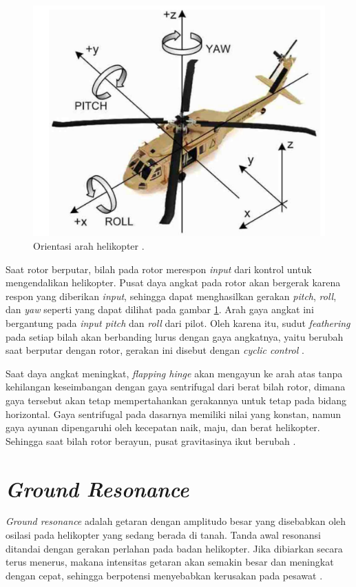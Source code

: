 \begin{figure}[H]
	\centering
	\includegraphics[width=0.55\linewidth]{gambar/roll-pitch-yaw.png}
	\caption{Orientasi arah helikopter \cite{Jhwang}.}
	\label{fig:orientasiheli}
\end{figure}

Saat rotor berputar, bilah pada rotor merespon \textit{input} dari kontrol untuk mengendalikan helikopter. Pusat daya angkat pada rotor akan bergerak karena respon yang diberikan \textit{input}, sehingga dapat menghasilkan gerakan \textit{pitch}, \textit{roll}, dan \textit{yaw} seperti yang dapat dilihat pada gambar \ref{fig:orientasiheli}. Arah gaya angkat ini bergantung pada \textit{input pitch} dan \textit{roll} dari pilot. Oleh karena itu, sudut \textit{feathering} pada setiap bilah akan berbanding lurus dengan gaya angkatnya, yaitu berubah saat berputar dengan rotor, gerakan ini disebut dengan \textit{cyclic control} \cite{handbook}.

Saat daya angkat meningkat, \textit{flapping hinge} akan mengayun ke arah atas tanpa kehilangan keseimbangan dengan gaya sentrifugal dari berat bilah rotor, dimana gaya tersebut akan tetap mempertahankan gerakannya untuk tetap pada bidang horizontal. Gaya sentrifugal pada dasarnya memiliki nilai yang konstan, namun gaya ayunan dipengaruhi oleh kecepatan naik, maju, dan berat helikopter. Sehingga saat bilah rotor berayun, pusat gravitasinya ikut berubah \cite{handbook}.

\section{\textit{Ground Resonance}}
\label{sec:groundresonance}

\textit{Ground resonance} adalah getaran dengan amplitudo besar yang disebabkan oleh osilasi pada helikopter yang sedang berada di tanah. Tanda awal resonansi ditandai dengan gerakan perlahan pada badan helikopter. Jika dibiarkan secara terus menerus, makana intensitas getaran akan semakin besar dan meningkat dengan cepat, sehingga berpotensi menyebabkan kerusakan pada pesawat \cite{wagtendonk2006principles}.

